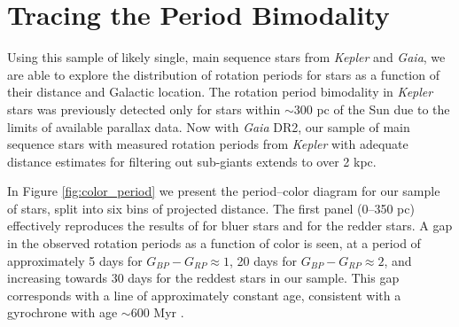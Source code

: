 \documentclass[preprint2]{aastex62}
\newcommand{\Kepler}{\textsl{Kepler}\xspace}
\begin{document}
\section{Tracing the Period Bimodality}


Using this sample of likely single, main sequence stars from \Kepler and {\em Gaia}, we are able to explore the distribution of rotation periods for stars as a function of their distance and Galactic location. The rotation period bimodality in \Kepler stars was previously detected only for stars within $\sim$300 pc of the Sun due to the limits of available parallax data. Now with {\em Gaia} DR2, our sample of main sequence stars with measured rotation periods from \Kepler with adequate distance estimates for filtering out sub-giants extends to over 2 kpc.


In Figure \ref{fig:color_period} we present the period--color diagram for our sample of stars, split into six bins of projected distance. The first panel (0--350 pc) effectively reproduces the results of \citet{davenport2017} for bluer stars and \citet{mcquillan2014} for the redder stars. A gap in the observed rotation periods as a function of color is seen, at a period of approximately 5 days for $G_{BP}-G_{RP}\approx1$, 20 days for $G_{BP}-G_{RP}\approx2$, and increasing towards 30 days for the reddest stars in our sample. This gap corresponds with a line of approximately constant age, consistent with a gyrochrone with age $\sim$600 Myr \citep{davenport2017}. 
\end{document}
